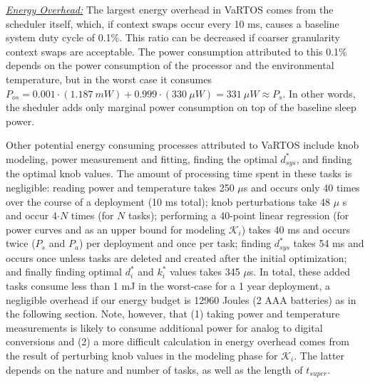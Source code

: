 %
%
%

\noindent\emph{\underline{Energy Overhead:}}
The largest energy overhead in VaRTOS comes from the scheduler itself, which, if context swaps occur every 10 ms, causes a baseline system duty cycle of 0.1\%. This ratio can be decreased if coarser granularity context swaps are acceptable.  The power consumption attributed to this 0.1\% depends on the power consumption of the processor and the environmental temperature, but in the worst case it consumes $P_{os} = 0.001\cdot(1.187~mW) + 0.999\cdot(330~\mu W) = 331~\mu W \approx P_s$. In other words, the sheduler adds only marginal power consumption on top of the baseline sleep power. 

Other potential energy consuming processes attributed to VaRTOS include knob modeling, power measurement and fitting, finding the optimal $d_{sys}^*$, and finding the optimal knob values.  The amount of processing time spent in these tasks is negligible:  reading power and temperature takes 250 $\mu$s and occurs only 40 times over the course of a deployment (10 ms total); knob perturbations take 48 $\mu$ s and occur 4$\cdot N$ times (for $N$ tasks); performing a 40-point linear regression (for power curves and as an upper bound for modeling $\mathcal{K}_i$) takes 40 ms and occurs twice ($P_s$ and $P_a$) per deployment and once per task; finding $d_{sys}^*$ takes 54 ms and occurs once unless tasks are deleted and created after the initial optimization; and finally finding optimal $d_i^*$ and $k_i^*$ values takes 345 $\mu$s.  In total, these added tasks consume less than 1 mJ in the worst-case for a 1 year deployment, a negligible overhead if our energy budget is 12960 Joules (2 AAA batteries) as in the following section. Note, however, that (1) taking power and temperature measurements is likely to consume additional power for analog to digital conversions and (2) a more difficult calculation in energy overhead comes from the result of perturbing knob values in the modeling phase for $\mathcal{K}_i$.  The latter depends on the nature and number of tasks, as well as the length of $t_{super}$. 



















